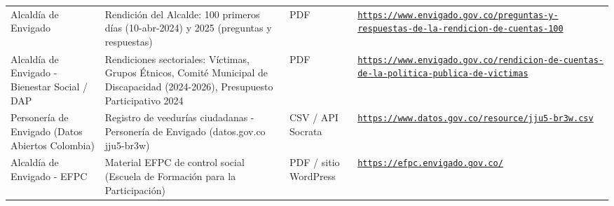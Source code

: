 \documentclass[11pt,letterpaper]{article}
\begin{document}
{\begin{xltabular}{\linewidth}{L{2.8cm}YL{1.6cm}Y}
Alcaldía de Envigado & Rendición del Alcalde: 100 primeros días (10-abr-2024) y 2025 (preguntas y respuestas) & PDF & \texttt{\footnotesize \href{https://www.envigado.gov.co/preguntas-y-respuestas-de-la-rendicion-de-cuentas-100}{https:/\allowbreak{}}\allowbreak{}\href{https://www.envigado.gov.co/preguntas-y-respuestas-de-la-rendicion-de-cuentas-100}{/\allowbreak{}}\allowbreak{}\href{https://www.envigado.gov.co/preguntas-y-respuestas-de-la-rendicion-de-cuentas-100}{www.\allowbreak{}envigado.\allowbreak{}gov.\allowbreak{}co/\allowbreak{}}\allowbreak{}\href{https://www.envigado.gov.co/preguntas-y-respuestas-de-la-rendicion-de-cuentas-100}{preguntas-\allowbreak{}y-\allowbreak{}respuestas-\allowbreak{}de-\allowbreak{}la-\allowbreak{}rendicion-\allowbreak{}de-\allowbreak{}cuentas-\allowbreak{}100}} \\
Alcaldía de Envigado - Bienestar Social /\allowbreak{} DAP & Rendiciones sectoriales: Víctimas, Grupos Étnicos, Comité Municipal de Discapacidad (2024-2026), Presupuesto Participativo 2024 & PDF & \texttt{\footnotesize \href{https://www.envigado.gov.co/rendicion-de-cuentas-de-la-politica-publica-de-victimas}{https:/\allowbreak{}}\allowbreak{}\href{https://www.envigado.gov.co/rendicion-de-cuentas-de-la-politica-publica-de-victimas}{/\allowbreak{}}\allowbreak{}\href{https://www.envigado.gov.co/rendicion-de-cuentas-de-la-politica-publica-de-victimas}{www.\allowbreak{}envigado.\allowbreak{}gov.\allowbreak{}co/\allowbreak{}}\allowbreak{}\href{https://www.envigado.gov.co/rendicion-de-cuentas-de-la-politica-publica-de-victimas}{rendicion-\allowbreak{}de-\allowbreak{}cuentas-\allowbreak{}de-\allowbreak{}la-\allowbreak{}politica-\allowbreak{}publica-\allowbreak{}de-\allowbreak{}victimas}} \\
Personería de Envigado (Datos Abiertos Colombia) & Registro de veedurías ciudadanas - Personería de Envigado (datos.\allowbreak{}gov.\allowbreak{}co jju5-br3w) & CSV /\allowbreak{} API Socrata & \texttt{\footnotesize \href{https://www.datos.gov.co/resource/jju5-br3w.csv}{https:/\allowbreak{}}\allowbreak{}\href{https://www.datos.gov.co/resource/jju5-br3w.csv}{/\allowbreak{}}\allowbreak{}\href{https://www.datos.gov.co/resource/jju5-br3w.csv}{www.\allowbreak{}datos.\allowbreak{}gov.\allowbreak{}co/\allowbreak{}}\allowbreak{}\href{https://www.datos.gov.co/resource/jju5-br3w.csv}{resource/\allowbreak{}}\allowbreak{}\href{https://www.datos.gov.co/resource/jju5-br3w.csv}{jju5-\allowbreak{}br3w.\allowbreak{}csv}} \\
Alcaldía de Envigado - EFPC & Material EFPC de control social (Escuela de Formación para la Participación) & PDF /\allowbreak{} sitio WordPress & \texttt{\footnotesize \href{https://efpc.envigado.gov.co/}{https:/\allowbreak{}}\allowbreak{}\href{https://efpc.envigado.gov.co/}{/\allowbreak{}}\allowbreak{}\href{https://efpc.envigado.gov.co/}{efpc.\allowbreak{}envigado.\allowbreak{}gov.\allowbreak{}co/\allowbreak{}}} \\

\end{xltabular}}
\end{document}
